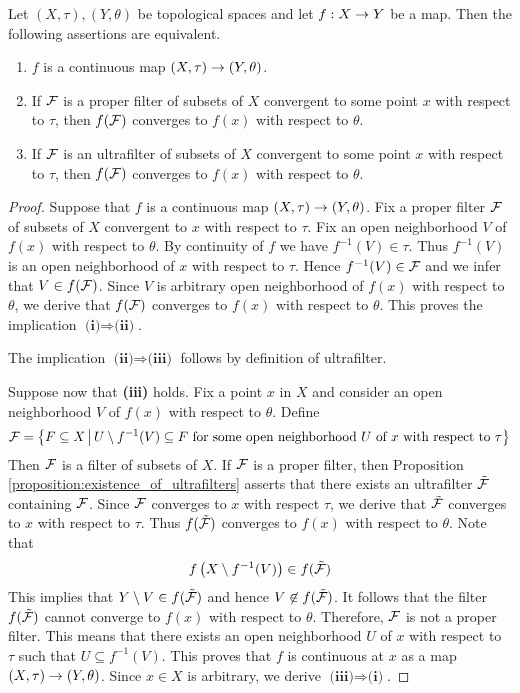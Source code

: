 \begin{proposition}\label{proposition:characterization_of_continuous_maps_in_terms_of_filters}
Let $(X,\tau),(Y,\theta)$ be topological spaces and let $f:X\rightarrow Y$ be a map. Then the following assertions are equivalent.
\begin{enumerate}[label=\emph{\textbf{(\roman*)}}, leftmargin=*]
\item $f$ is a continuous map $\left(X,\tau\right)\rightarrow \left(Y,\theta\right)$.
\item If ${\mathcal F}$ is a proper filter of subsets of $X$ convergent to some point $x$ with respect to $\tau$, then $f({\mathcal F})$ converges to $f(x)$ with respect to $\theta$.
\item If ${\mathcal F}$ is an ultrafilter of subsets of $X$ convergent to some point $x$ with respect to $\tau$, then $f({\mathcal F})$ converges to $f(x)$ with respect to $\theta$.
\end{enumerate}
\end{proposition}
\begin{proof}
Suppose that $f$ is a continuous map $\left(X,\tau\right)\rightarrow \left(Y,\theta\right)$. Fix a proper filter ${\mathcal F}$ of subsets of $X$ convergent to $x$ with respect to $\tau$. Fix an open neighborhood $V$ of $f(x)$ with respect to $\theta$. By continuity of $f$ we have $f^{-1}(V) \in \tau$. Thus $f^{-1}(V)$ is an open neighborhood of $x$ with respect to $\tau$. Hence $f^{-1}(V) \in {\mathcal F}$ and we infer that $V \in f({\mathcal F})$. Since $V$ is arbitrary open neighborhood of $f(x)$ with respect to $\theta$, we derive that $f({\mathcal F})$ converges to $f(x)$ with respect to $\theta$. This proves the implication $\textbf{(i)}\Rightarrow \textbf{(ii)}$.

The implication $\textbf{(ii)}\Rightarrow \textbf{(iii)}$ follows by definition of ultrafilter.

Suppose now that \textbf{(iii)} holds. Fix a point $x$ in $X$ and consider an open neighborhood $V$ of $f(x)$ with respect to $\theta$. Define
$${\mathcal F} = \big\{F\subseteq X\,\big|\,U\setminus f^{-1}(V)\subseteq F\mbox{ for some open neighborhood }U\mbox{ of }x\mbox{ with respect to }\tau\big\}$$
Then ${\mathcal F}$ is a filter of subsets of $X$. If ${\mathcal F}$ is a proper filter, then Proposition \ref{proposition:existence_of_ultrafilters} asserts that there exists an ultrafilter $\tilde{{\mathcal F}}$ containing ${\mathcal F}$. Since ${\mathcal F}$ converges to $x$ with respect $\tau$, we derive that $\tilde{{\mathcal F}}$ converges to $x$ with respect to $\tau$. Thus $f(\tilde{{\mathcal F}})$ converges to $f(x)$ with respect to $\theta$. Note that
$$f\left(X\setminus f^{-1}(V)\right) \in f(\tilde{{\mathcal F}})$$
This implies that $Y\setminus V \in f(\tilde{{\mathcal F}})$ and hence $V \not \in f(\tilde{{\mathcal F}})$. It follows that the filter $f(\tilde{{\mathcal F}})$ cannot converge to $f(x)$ with respect to $\theta$. Therefore, ${\mathcal F}$ is not a proper filter. This means that there exists an open neighborhood $U$ of $x$ with respect to $\tau$ such that $U \subseteq f^{-1}(V)$. This proves that $f$ is continuous at $x$ as a map $\left(X,\tau\right)\rightarrow \left(Y,\theta\right)$. Since $x\in X$ is arbitrary, we derive $\textbf{(iii)}\Rightarrow \textbf{(i)}$.
\end{proof}

